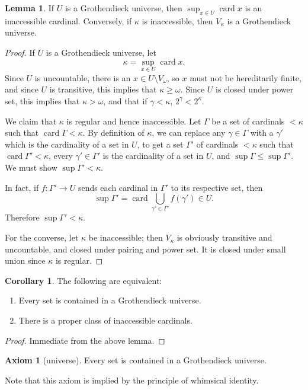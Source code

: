 \documentclass[12pt]{report}
\newcommand{\card}{\operatorname{card}}
\theoremstyle{definition}
\newtheorem{lemma}[theorem]{Lemma}
\newtheorem{corollary}[theorem]{Corollary}
\newtheorem{axiom}[theorem]{Axiom}
\begin{document}
\begin{lemma}
If $U$ is a Grothendieck universe, then $\sup_{x \in U} \card x$ is an inaccessible cardinal. Conversely, if $\kappa$ is inaccessible, then $V_\kappa$ is a Grothendieck universe.
\end{lemma}
\begin{proof}
If $U$ is a Grothendieck universe, let
$$\kappa = \sup_{x \in U} \card x.$$
Since $U$ is uncountable, there is an $x \in U \setminus V_\omega$, so $x$ must not be hereditarily finite, and since $U$ is transitive, this implies that $\kappa \geq \omega$.
Since $U$ is closed under power set, this implies that $\kappa > \omega$, and that if $\gamma < \kappa$, $2^\gamma < 2^\kappa$.

We claim that $\kappa$ is regular and hence inaccessible. Let $\Gamma$ be a set of cardinals $< \kappa$ such that $\card \Gamma < \kappa$. By definition of $\kappa$, we can replace any $\gamma \in \Gamma$ with a $\gamma'$ which is the cardinality of a set in $U$,
to get a set $\Gamma'$ of cardinals $< \kappa$ such that $\card \Gamma' < \kappa$, every $\gamma' \in \Gamma'$ is the cardinality of a set in $U$, and $\sup \Gamma \leq \sup \Gamma'$. We must show $\sup \Gamma' < \kappa$.

In fact, if $f: \Gamma' \to U$ sends each cardinal in $\Gamma'$ to its respective set, then
$$\sup \Gamma' = \card \bigcup_{\gamma' \in \Gamma'} f(\gamma') \in U.$$
Therefore $\sup \Gamma' < \kappa$.

For the converse, let $\kappa$ be inaccessible; then $V_\kappa$ is obviously transitive and uncountable, and closed under pairing and power set. It is closed under small union since $\kappa$ is regular.
\end{proof}
\begin{corollary}
The following are equivalent:
\begin{enumerate}
\item Every set is contained in a Grothendieck universe.
\item There is a proper class of inaccessible cardinals.
\end{enumerate}
\end{corollary}
\begin{proof}
Immediate from the above lemma.
\end{proof}
\begin{axiom}[universe]
Every set is contained in a Grothendieck universe.
\end{axiom}
Note that this axiom is implied by the principle of whimsical identity.
\end{document}
